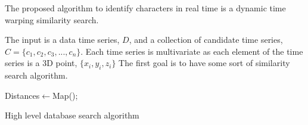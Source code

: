 The proposed algorithm to identify characters in real time is a dynamic time warping similarity search. 


The input is a data time series, \(D\), and a collection of candidate time series, \( C = \{c_1, c_2, c_3, ..., c_n\}\).
Each time series is multivariate as each element of the time series is a 3D point, \(\{x_i, y_i,z_i\}\)
The first goal is to have some sort of similarity search algorithm.
\begin{algorithm}[h]



 \Input{\Collection, \D}
 Distances$\leftarrow$Map();\\
 \caption{High level database search algorithm}
\end{algorithm}

